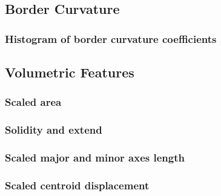 \documentclass[12pt]{article}
\begin{document}
\subsection{Border Curvature}
\subsubsection{Histogram of border curvature coefficients}

\subsection{Volumetric Features}
\subsubsection{Scaled area}
\subsubsection{Solidity and extend}
\subsubsection{Scaled major and minor axes length}
\subsubsection{Scaled centroid displacement}
\end{document}
